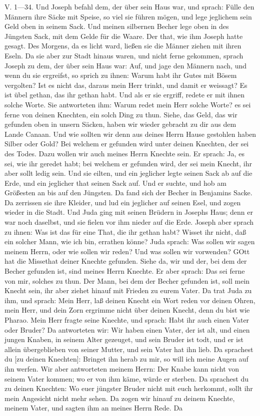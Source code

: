 \begin{schriftzitat}
V. 1—34. Und Joseph befahl dem, der über sein Haus war, und sprach: Fülle den Männern ihre Säcke mit Speise, so viel sie führen mögen, und lege jeglichem sein Geld oben in seinem Sack. Und meinen silbernen Becher lege oben in des Jüngsten Sack, mit dem Gelde für die Waare. Der that, wie ihm Joseph hatte gesagt. Des Morgens, da es licht ward, ließen sie die Männer ziehen mit ihren Eseln. Da sie aber zur Stadt hinaus waren, und nicht ferne gekommen, sprach Joseph zu dem, der über sein Haus war: Auf, und jage den Männern nach, und wenn du sie ergreifst, so sprich zu ihnen: Warum habt ihr Gutes mit Bösem vergolten? Ist es nicht das, daraus mein Herr trinkt, und damit er weissagt? Es ist übel gethan, das ihr gethan habt. Und als er sie ergriff, redete er mit ihnen solche Worte. Sie antworteten ihm: Warum redet mein Herr solche Worte? es sei ferne von deinen Knechten, ein solch Ding zu thun. Siehe, das Geld, das wir gefunden oben in unsern Säcken, haben wir wieder gebracht zu dir aus dem Lande Canaan. Und wie sollten wir denn aus deines Herrn Hause gestohlen haben Silber oder Gold? Bei welchem er gefunden wird unter deinen Knechten, der sei des Todes. Dazu wollen wir auch meines Herrn Knechte sein. Er sprach: Ja, es sei, wie ihr geredet habt; bei welchem er gefunden wird, der sei mein Knecht, ihr aber sollt ledig sein. Und sie eilten, und ein jeglicher legte seinen Sack ab auf die Erde, und ein jeglicher that seinen Sack auf. Und er suchte, und hob am Größesten an bis auf den Jüngsten. Da fand sich der Becher in Benjamins Sacke. Da zerrissen sie ihre Kleider, und lud ein jeglicher auf seinen Esel, und zogen wieder in die Stadt. Und Juda ging mit seinen Brüdern in Josephs Haus; denn er war noch daselbst, und sie fielen vor ihm nieder auf die Erde. Joseph aber sprach zu ihnen: Was ist das für eine That, die ihr gethan habt? Wisset ihr nicht, daß ein solcher Mann, wie ich bin, errathen könne? Juda sprach: Was sollen wir sagen meinem Herrn, oder wie sollen wir reden? Und was sollen wir vorwenden? GOtt hat die Missethat deiner Knechte gefunden. Siehe da, wir und der, bei dem der Becher gefunden ist, sind meines Herrn Knechte. Er aber sprach: Das sei ferne von mir, solches zu thun. Der Mann, bei dem der Becher gefunden ist, soll mein Knecht sein, ihr aber ziehet hinauf mit Frieden zu eurem Vater. Da trat Juda zu ihm, und sprach: Mein Herr, laß deinen Knecht ein Wort reden vor deinen Ohren, mein Herr, und dein Zorn ergrimme nicht über deinen Knecht, denn du bist wie Pharao. Mein Herr fragte seine Knechte, und sprach: Habt ihr auch einen Vater oder Bruder? Da antworteten wir: Wir haben einen Vater, der ist alt, und einen jungen Knaben, in seinem Alter gezeuget, und sein Bruder ist todt, und er ist allein übergeblieben von seiner Mutter, und sein Vater hat ihn lieb. Da sprachest du [zu deinen Knechten]: Bringet ihn herab zu mir, so will ich meine Augen auf ihn werfen. Wir aber antworteten meinem Herrn: Der Knabe kann nicht von seinem Vater kommen; wo er von ihm käme, würde er sterben. Da sprachest du zu deinen Knechten: Wo euer jüngster Bruder nicht mit euch herkommt, sollt ihr mein Angesicht nicht mehr sehen. Da zogen wir hinauf zu deinem Knechte, meinem Vater, und sagten ihm an meines Herrn Rede. Da 
\end{schriftzitat}
